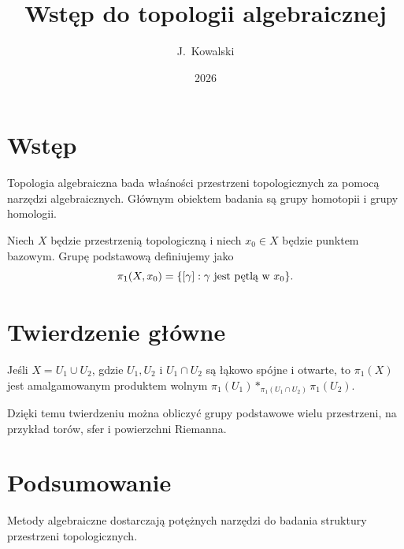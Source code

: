 \documentclass{article}
\title{Wst\k{e}p do topologii algebraicznej}
\author{J.~Kowalski}
\date{2026}
\begin{document}
\maketitle

\section{Wst\k{e}p}

Topologia algebraiczna bada w\l{}a\'sno\'sci przestrzeni topologicznych za
pomoc\k{a} narz\k{e}dzi algebraicznych.  G\l{}\'ownym obiektem badania s\k{a}
grupy homotopii i grupy homologii.

Niech $X$ b\k{e}dzie przestrzeni\k{a} topologiczn\k{a} i niech $x_0 \in X$
b\k{e}dzie punktem bazowym.  Grup\k{e} podstawow\k{a} definiujemy jako
\[
  \pi_1(X, x_0) = \{[\gamma] : \gamma \text{ jest p\k{e}tl\k{a} w } x_0\}.
\]

\section{Twierdzenie g\l{}\'owne}

\begin{theorem}
Je\'sli $X = U_1 \cup U_2$, gdzie $U_1, U_2$ i $U_1 \cap U_2$ s\k{a}
\l{}\k{a}kowo sp\'ojne i otwarte, to $\pi_1(X)$ jest amalgamowanym produktem
wolnym $\pi_1(U_1) *_{\pi_1(U_1 \cap U_2)} \pi_1(U_2)$.
\end{theorem}

Dzi\k{e}ki temu twierdzeniu mo\.zna obliczy\'c grupy podstawowe wielu
przestrzeni, na przyk\l{}ad tor\'ow, sfer i powierzchni Riemanna.

\section{Podsumowanie}

Metody algebraiczne dostarczaj\k{a} pot\k{e}\.znych narz\k{e}dzi do badania
struktury przestrzeni topologicznych.
\end{document}
